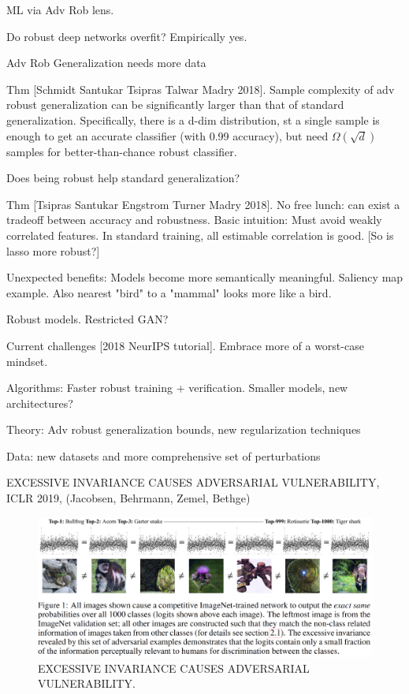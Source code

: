 \documentclass[english]{article}
\begin{document}
\item ML via Adv Rob lens. 

\benum 
\item Do robust deep networks overfit? Empirically yes. 

Adv Rob Generalization needs more data

Thm [Schmidt Santukar Tsipras Talwar Madry 2018]. Sample complexity of adv robust generalization can be significantly larger than that of standard generalization. Specifically, there is a d-dim distribution, st a single sample is enough to get an accurate classifier (with 0.99 accuracy), but need $\Omega(\sqrt{d})$ samples for better-than-chance robust classifier.

\item Does being robust help standard generalization? 


Thm [Tsipras Santukar Engstrom Turner Madry 2018]. No free lunch: can exist a tradeoff between accuracy and robustness. Basic intuition: Must avoid weakly correlated features. In standard training, all estimable correlation is good. [So is lasso more robust?]

\item Unexpected benefits: Models become more semantically meaningful. Saliency map example. Also nearest "bird" to a "mammal" looks more like a bird. 

Robust models. Restricted GAN?


\eenum
\item Current challenges [2018 NeurIPS tutorial]. Embrace more of a worst-case mindset.


\benum 
\item Algorithms: Faster robust training + verification. Smaller models, new architectures?

\item Theory: Adv robust generalization bounds, new regularization techniques

\item Data: new datasets and more comprehensive set of perturbations

\eenum

\item EXCESSIVE INVARIANCE CAUSES ADVERSARIAL
VULNERABILITY, ICLR 2019, (Jacobsen, Behrmann, Zemel, Bethge)

  \begin{figure}
        \centering
        \includegraphics[scale = 0.35]{inv}
        
        \caption{EXCESSIVE INVARIANCE CAUSES ADVERSARIAL
VULNERABILITY.}
        \label{inv}
    \end{figure}
\end{document}
